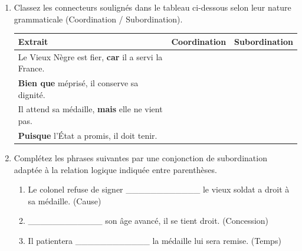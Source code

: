 \documentclass[11pt]{article}
\begin{document}
\begin{exercice}
\begin{enumerate}
    \item Classez les connecteurs soulignés dans le tableau ci-dessous selon leur nature grammaticale (Coordination / Subordination).
    \begin{tabular}{|p{6cm}|c|c|}
    \hline
    \textbf{Extrait} & \textbf{Coordination} & \textbf{Subordination} \\
    \hline
    Le Vieux Nègre est fier, \textbf{car} il a servi la France. & & \\
    \hline
    \textbf{Bien que} méprisé, il conserve sa dignité. & & \\
    \hline
    Il attend sa médaille, \textbf{mais} elle ne vient pas. & & \\
    \hline
    \textbf{Puisque} l'État a promis, il doit tenir. & & \\
    \hline
    \end{tabular}
    \item Complétez les phrases suivantes par une conjonction de subordination adaptée à la relation logique indiquée entre parenthèses.
    \begin{enumerate}
        \item Le colonel refuse de signer \_\_\_\_\_\_\_\_\_\_\_\_ le vieux soldat a droit à sa médaille. (Cause)
        \item \_\_\_\_\_\_\_\_\_\_\_\_ son âge avancé, il se tient droit. (Concession)
        \item Il patientera \_\_\_\_\_\_\_\_\_\_\_\_ la médaille lui sera remise. (Temps)
    \end{enumerate}
\end{enumerate}
\end{exercice}
\end{document}
